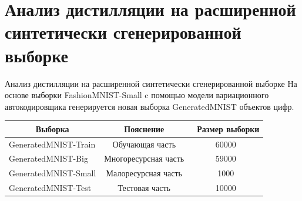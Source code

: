 \documentclass[10pt,pdf,hyperref={unicode}]{beamer}
\begin{document}
\section{Анализ дистилляции на расширенной синтетически сгенерированной выборке}
\begin{frame}{Анализ дистилляции на расширенной синтетически сгенерированной выборке}
\justifying
На основе выборки FashionMNIST-Small c помощью модели вариационного автокодировщика генерируется новая выборка GeneratedMNIST объектов цифр.


\begin{table}[h!t]
\begin{center}
\label{table_2}
\begin{tabular}{|c|c|c|}
\hline
	Выборка & Пояснение &\ Размер выборки\\
	\hline
	\multicolumn{1}{|l|}{GeneratedMNIST-Train}
	& Обучающая часть& 60000\\
	\hline
	\multicolumn{1}{|l|}{GeneratedMNIST-Big}
	& Многоресурсная часть& 59000\\
	\hline
	\multicolumn{1}{|l|}{GeneratedMNIST-Small}
	& Малоресурсная часть& 1000\\
	\hline
	\multicolumn{1}{|l|}{GeneratedMNIST-Test}
	& Тестовая часть& 10000\\

\hline

\end{tabular}
\end{center}
\end{table}

\end{frame}

\end{document}

